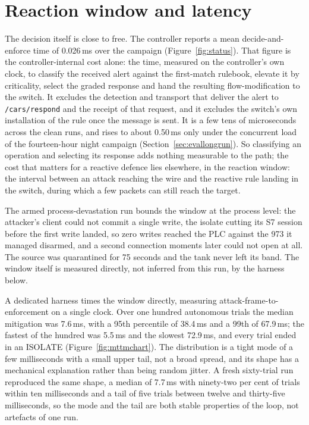 \section{Reaction window and latency}
\label{sec:evallatency}

The decision itself is close to free. The controller reports a mean decide-and-enforce time of 0.026\,ms over the campaign (Figure~\ref{fig:status}). That figure is the controller-internal cost alone: the time, measured on the controller's own clock, to classify the received alert against the first-match rulebook, elevate it by criticality, select the graded response and hand the resulting flow-modification to the switch. It excludes the detection and transport that deliver the alert to \texttt{/cars/respond} and the receipt of that request, and it excludes the switch's own installation of the rule once the message is sent. It is a few tens of microseconds across the clean runs, and rises to about 0.50\,ms only under the concurrent load of the fourteen-hour night campaign (Section~\ref{sec:evallongrun}). So classifying an operation and selecting its response adds nothing measurable to the path; the cost that matters for a reactive defence lies elsewhere, in the reaction window: the interval between an attack reaching the wire and the reactive rule landing in the switch, during which a few packets can still reach the target.

The armed process-devastation run bounds the window at the process level: the attacker's client could not commit a single write, the isolate cutting its S7 session before the first write landed, so zero writes reached the PLC against the 973 it managed disarmed, and a second connection moments later could not open at all. The source was quarantined for 75 seconds and the tank never left its band. The window itself is measured directly, not inferred from this run, by the harness below.

A dedicated harness times the window directly, measuring attack-frame-to-enforcement on a single clock. Over one hundred autonomous trials the median mitigation was 7.6\,ms, with a 95th percentile of 38.4\,ms and a 99th of 67.9\,ms; the fastest of the hundred was 5.5\,ms and the slowest 72.9\,ms, and every trial ended in an ISOLATE (Figure~\ref{fig:mttmchart}). The distribution is a tight mode of a few milliseconds with a small upper tail, not a broad spread, and its shape has a mechanical explanation rather than being random jitter. A fresh sixty-trial run reproduced the same shape, a median of 7.7\,ms with ninety-two per cent of trials within ten milliseconds and a tail of five trials between twelve and thirty-five milliseconds, so the mode and the tail are both stable properties of the loop, not artefacts of one run.

